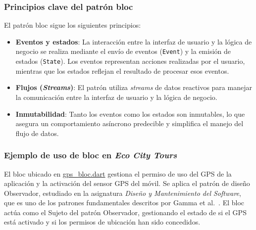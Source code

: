 \subsubsection{Principios clave del patrón \acrshort{bloc}}
	El patrón \acrfull{bloc} sigue los siguientes principios:
	\begin{itemize}
		\item \textbf{Eventos y estados}: La interacción entre la interfaz de usuario y la lógica de negocio se realiza mediante el envío de eventos (\texttt{Event}) y la emisión de estados (\texttt{State}). Los eventos representan acciones realizadas por el usuario, mientras que los estados reflejan el resultado de procesar esos eventos.
		\item \textbf{Flujos (\textit{Streams})}: El patrón utiliza \textit{streams} de datos reactivos para manejar la comunicación entre la interfaz de usuario y la lógica de negocio.
		\item \textbf{Inmutabilidad}: Tanto los eventos como los estados son inmutables, lo que asegura un comportamiento asíncrono predecible y simplifica el manejo del flujo de datos.
	\end{itemize}
	
\subsubsection{Ejemplo de uso de \acrshort{bloc} en \textit{Eco City Tours}}
El \acrshort{bloc} ubicado en \href{https://github.com/fps1001/TFGII_FPisot/tree/main/project-app/project_app/lib/blocs/gps/gps_bloc.dart}{gps\_bloc.dart} gestiona el permiso de uso del GPS de la aplicación y la activación del sensor GPS del móvil. 
Se aplica el patrón de diseño Observador, estudiado en la asignatura \textit{Diseño y Mantenimiento del Software}, que es uno de los patrones fundamentales descritos por Gamma et al.~\cite{gamma2002}.
El \acrshort{bloc} actúa como el Sujeto del patrón Observador, gestionando el estado de si el GPS está activado y si los permisos de ubicación han sido concedidos.

